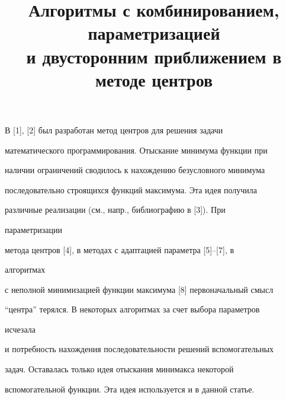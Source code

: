 

\title{Алгоритмы с комбинированием, параметризацией\\ 


и двусторонним приближением в методе центров} 


 


\date{} 




 


\pagestyle{plain} %


 


 




 


\maketitle 


\label{begin} 


 


В [1], [2] был разработан метод центров для решения задачи 


математического программирования. Отыскание минимума функции при 


наличии ограничений сводилось к нахождению безусловного минимума 


последовательно строящихся функций максимума. Эта идея получила 


различные реализации (см., напр., библиографию в [3]). При 


параметризации 


метода центров [4], в методах с адаптацией параметра [5]--[7], в 


алгоритмах 


с неполной минимизацией функции максимума [8] первоначальный смысл 


``центра'' терялся. В некоторых алгоритмах за счет выбора параметров 


исчезала 


и потребность нахождения последовательности решений вспомогательных 


задач. Оставалась только идея отыскания минимакса некоторой 


вспомогательной функции. Эта идея используется и в данной статье. 


